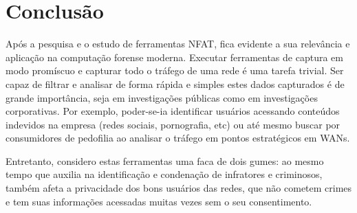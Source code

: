 \documentclass[12pt]{article}
\begin{document}
\section{Conclusão}

Após a pesquisa e o estudo de ferramentas NFAT, fica evidente a sua relevância e aplicação na computação forense moderna. Executar ferramentas de captura em modo promíscuo e capturar todo o tráfego de uma rede é uma tarefa trivial. Ser capaz de filtrar e analisar de forma rápida e simples estes dados capturados é de grande importância, seja em investigações públicas como em investigações corporativas. Por exemplo, poder-se-ia identificar usuários acessando conteúdos indevidos na empresa (redes sociais, pornografia, etc) ou até mesmo buscar por consumidores de pedofilia ao analisar o tráfego em pontos estratégicos em WANs.

Entretanto, considero estas ferramentas uma faca de dois gumes: ao mesmo tempo que auxilia na identificação e condenação de infratores e criminosos, também afeta a privacidade dos bons usuários das redes, que não cometem crimes e tem suas informações acessadas muitas vezes sem o seu consentimento.

\nocite{*}


\end{document}
